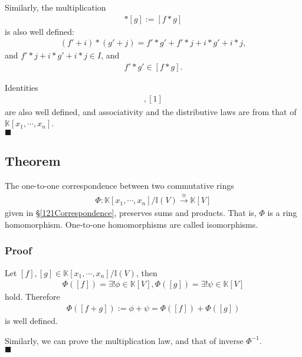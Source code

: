 \documentclass[11pt]{book}
\begin{document}
Similarly, the multiplication
\begin{eqnarray}
[f] * [g] := [f*g]
\end{eqnarray}
is also well defined:
\begin{eqnarray}
(f' + i) * (g' + j) = f'*g' + f'*j + i*g' + i*j,
\end{eqnarray}
and $f'*j + i*g' + i*j \in I$, and
\begin{eqnarray}
f' * g' \in [f*g].
\end{eqnarray}

Identities
\begin{eqnarray}
[0], [1]
\end{eqnarray}
are also well defined, and associativity and the distributive laws are from that of $\mathbb{K}[x_1, \cdots, x_n]$.\\
$\blacksquare$

\subsection{Theorem}
The one-to-one correspondence between two commutative rings
\begin{eqnarray}
\Phi : \mathbb{K}[x_1, \cdots, x_n]/ \mathbb{I}(V) \stackrel{\cong}{\to} \mathbb{K}[V] 
\end{eqnarray}
given in \S\ref{121Correspondence}, preserves sums and products.
That is, $\Phi$ is a ring homomorphism.
One-to-one homomorphisms are called isomorphisms.

\subsubsection{Proof}
Let $[f], [g] \in \mathbb{K}[x_1, \cdots, x_n]/ \mathbb{I}(V)$, then
\begin{eqnarray}
\Phi([f]) = \exists! \phi \in \mathbb{K}[V], \Phi([g]) = \exists! \psi \in \mathbb{K}[V]
\end{eqnarray}
hold.
Therefore
\begin{eqnarray}
\Phi([f+g]) := \phi + \psi = \Phi([f]) + \Phi([g])
\end{eqnarray}
is well defined.

Similarly, we can prove the multiplication law, and that of inverse $\Phi^{-1}$.\\
$\blacksquare$
\end{document}
